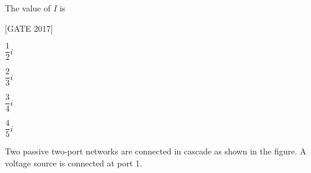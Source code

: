 The value of $ I $ is

\hfill{[GATE 2017]} \begin{enumerate}
    \begin{multicols}{2}
        \item $\dfrac{1}{2} i$\\
        \item  $\dfrac{2}{3} i$
        \item $\dfrac{3}{4} i$\\
        \item $\dfrac{4}{5} i$
    \end{multicols}
\end{enumerate}
\item Two passive two-port networks are connected in cascade as shown in the figure. A voltage source is connected at port 1.

